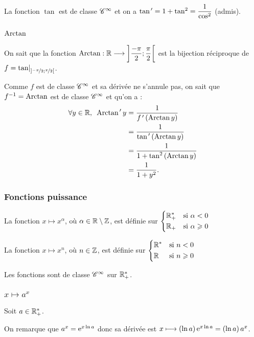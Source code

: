La fonction \(\tan\) est de classe \(\mathscr{C}^{\infty}\) et on a \(\tan^{\,\prime}=1+\tan^2=\dfrac{1}{\cos^2}\) (admis).

\subsubsection{\(\operatorname{Arctan}\)}

On sait que la fonction \(\operatorname{Arctan}:\mathbb{R}\longrightarrow\left]\dfrac{-\pi}{2};\dfrac{\pi}{2}\right[\) est la bijection réciproque de \(f=\restr{\tan}{\intervee{\nicefrac{-\pi}{2}}{\nicefrac{\pi}{2}}}\).

Comme \(f\) est de classe \(\mathscr{C}^{\infty}\) et sa dérivée ne s'annule pas, on sait que \(f^{-1}=\operatorname{Arctan}\) est de classe \(\mathscr{C}^{\infty}\) et qu'on a : \[\begin{aligned}
\quantifs{\forall y\in\R}\Arctan\prim y&=\dfrac{1}{f\prim\paren{\Arctan y}} \\
&=\dfrac{1}{\tan\prim\paren{\Arctan y}} \\
&=\dfrac{1}{1+\tan^2\paren{\Arctan y}} \\
&=\dfrac{1}{1+y^2}.
\end{aligned}\]

\subsubsection{Fonctions puissance}

La fonction \(x\mapsto x^{\alpha}\), où \(\alpha\in\mathbb{R}\setminus\mathbb{Z}\), est définie sur \(\begin{dcases}\mathbb{R}_+^* &\text{si }\alpha<0 \\ \mathbb{R}_+ &\text{si }\alpha\geqslant0\end{dcases}\)

La fonction \(x\mapsto x^{n}\), où \(n\in\mathbb{Z}\), est définie sur \(\begin{dcases}\mathbb{R}^* &\text{si }n<0 \\ \mathbb{R} &\text{si }n\geqslant0\end{dcases}\)

Les fonctions sont de classe \(\mathscr{C}^{\infty}\) sur \(\mathbb{R}_+^*\).

\subsubsection{\(x\mapsto a^x\)}

Soit \(a\in\mathbb{R}_+^*\).

On remarque que \(a^x=\mathrm{e}^{x\ln a}\) donc sa dérivée est \(x\longmapsto\left(\ln a\right)\mathrm{e}^{x\ln a}=\left(\ln a\right)a^x\).

